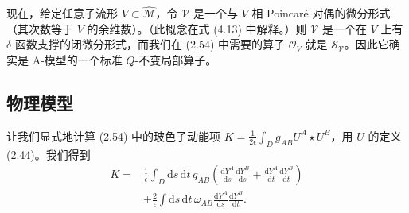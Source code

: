 \documentclass[11pt,a4paper,UTF8]{ctexart}
\theoremstyle{plain}
\theoremstyle{definition}
\begin{document}

现在，给定任意子流形 $V\subset\widehat{\mathcal{M}}$，令 $\mathcal{V}$ 是一个与 $V$ 相 Poincaré 对偶的微分形式（其次数等于 $V$ 的余维数）。（此概念在式 (4.13) 中解释。）则 $\mathcal{V}$ 是一个在 $V$ 上有 $\delta$ 函数支撑的闭微分形式，而我们在 (2.54) 中需要的算子 $\mathcal{O}_V$ 就是 $\mathcal{S}_{\mathcal{V}}$。因此它确实是 A-模型的一个标准 $Q$-不变局部算子。


\subsection{物理模型}

让我们显式地计算 (2.54) 中的玻色子动能项 $K=\frac{1}{2\epsilon}\int_D g_{AB}U^A\star U^B$，用 $U$ 的定义 (2.44)。我们得到
\begin{equation}
\begin{split}
    K={}&\frac{1}{\epsilon}\int_D \mathrm{d}s\,\mathrm{d}t\, g_{AB}\left(\frac{\mathrm{d}Y^A}{\mathrm{d}s}\frac{\mathrm{d}Y^B}{\mathrm{d}s}+\frac{\mathrm{d}Y^A}{\mathrm{d}t}\frac{\mathrm{d}Y^B}{\mathrm{d}t}\right)\\
    &+\frac{2}{\epsilon}\int \mathrm{d}s\,\mathrm{d}t\,\omega_{AB}\frac{\mathrm{d}Y^A}{\mathrm{d}s}\frac{\mathrm{d}Y^B}{\mathrm{d}t}.
\end{split}
    \tag{2.55}
\end{equation}

\end{document}
